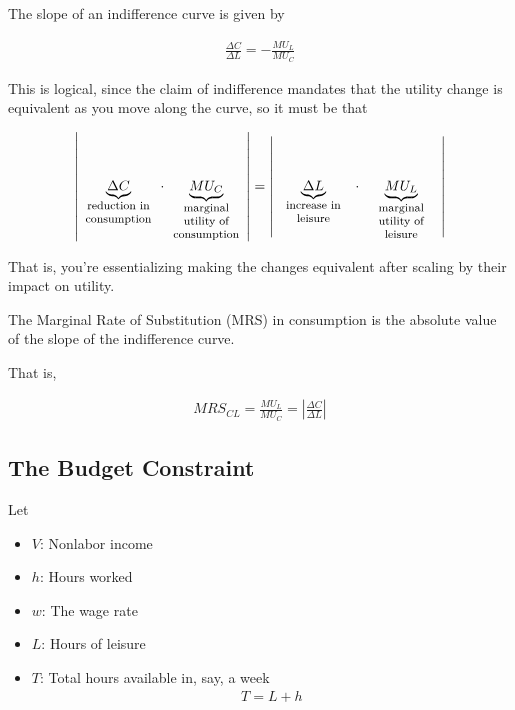 The slope of an indifference curve is
given by

\begin{align}
    \frac{\Delta C}{\Delta L}=-\frac{M U_L}{M U_C}
\end{align}

This is logical, since the claim of indifference 
mandates that the utility change is equivalent
as you move along the curve, so it must be that

\begin{align}
    \left| \underbrace{\Delta C}_{\parbox[t]{2cm}{\raggedright \footnotesize \centering reduction in consumption}} \cdot \underbrace{M U_C}_{\parbox[t]{2cm}{\raggedright \footnotesize \centering marginal utility of consumption}} \right| = \left| \underbrace{\Delta L}_{\parbox[t]{2cm}{\raggedright \footnotesize \centering increase in leisure}} \cdot \underbrace{M U_L}_{\parbox[t]{2cm}{\raggedright \footnotesize \centering marginal utility of leisure}} \right|
\end{align}

That is, you're essentializing making the changes equivalent 
after scaling by their impact on utility.

\begin{definition} 
    
    The Marginal Rate of Substitution (MRS) in consumption
    is the absolute value of the slope of the 
    indifference curve.

    That is,

    \begin{align}
        M R S_{C L}=\frac{M U_L}{M U_C} = \left|\frac{\Delta C}{\Delta L}\right|
    \end{align}

\end{definition}

\subsection{The Budget Constraint}

Let

\begin{itemize}
    \item $V$: Nonlabor income
    \item $h$: Hours worked
    \item $w$: The wage rate
    \item $L$: Hours of leisure
    \item $T$: Total hours available in, say, a week
        \begin{align}
            T = L + h
        \end{align}
\end{itemize}

